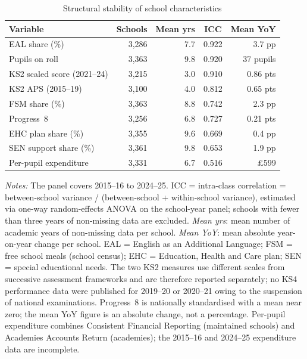 \begin{table}[htb]

\centering\caption{Structural stability of school characteristics}
\label{tab:structural_stability}
\small
\begin{tabular}{lrrrr}
\toprule
Variable & \multicolumn{1}{c}{Schools} & \multicolumn{1}{c}{Mean yrs}  & \multicolumn{1}{c}{ICC} & \multicolumn{1}{c}{Mean YoY} \\
\midrule
EAL share (\%)  & {3,286} & 7.7 & 0.922 & 3.7 pp \\
Pupils on roll  & {3,363} & 9.8 & 0.920 & 37 pupils \\
KS2 scaled score (2021--24)  & {3,215} & 3.0 & 0.910 & 0.86 pts \\
KS2 APS (2015--19)  & {3,100} & 4.0 & 0.812 & 0.65 pts \\
FSM share (\%)  & {3,363} & 8.8 & 0.742 & 2.3 pp \\
Progress~8  & {3,256} & 6.8 & 0.727 & 0.21 pts \\
EHC plan share (\%)  & {3,355} & 9.6 & 0.669 & 0.4 pp \\
SEN support share (\%)  & {3,361} & 9.8 & 0.653 & 1.9 pp \\
Per-pupil expenditure  & {3,331} & 6.7 & 0.516 & \pounds599 \\
\bottomrule
\end{tabular}
\begin{minipage}{\linewidth}
\smallskip
\footnotesize\textit{Notes:} The panel covers 2015--16 to 2024--25. ICC = intra-class correlation = between-school
variance / (between-school + within-school variance), estimated via one-way
random-effects ANOVA on the school-year panel; schools with fewer than three
years of non-missing data are excluded. \textit{Mean yrs}: mean number of
academic years of non-missing data per school. \textit{Mean YoY}: mean
absolute year-on-year change per school. EAL = English as an Additional
Language; FSM = free school meals (school census); EHC = Education, Health and
Care plan; SEN = special educational needs. The two KS2 measures use different scales from successive assessment frameworks and are therefore reported separately; no KS4 performance data
were published for 2019--20 or 2020--21 owing to the suspension of national
examinations. Progress~8 is nationally standardised with a mean near zero;
the mean YoY figure is an absolute change, not a percentage.
Per-pupil expenditure combines Consistent Financial Reporting (maintained
schools) and Academies Accounts Return (academies); the 2015--16 and 2024--25 expenditure data are incomplete.
\end{minipage}
\end{table}